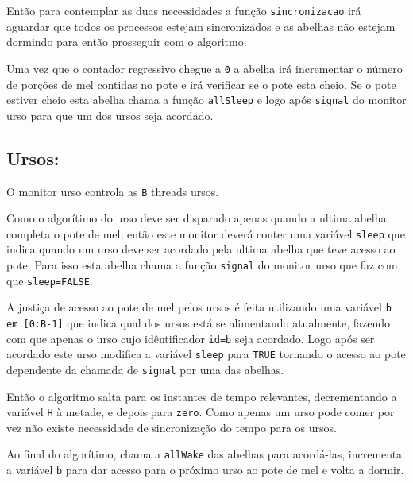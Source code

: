 \documentclass[12pt,a4paper]{article}
\begin{document}
Então para contemplar as duas necessidades a função \verb+sincronizacao+ irá aguardar que todos os processos estejam sincronizados e as abelhas não estejam dormindo para então prosseguir com o algoritmo.

Uma vez que o contador regressivo chegue a \verb+0+ a abelha irá incrementar o número de porções de mel contidas no pote e irá verificar se o pote esta cheio. Se o pote estiver cheio esta abelha chama a função \verb+allSleep+ e logo após \verb+signal+ do monitor urso para que um dos ursos seja acordado.

\subsection{Ursos:}

O monitor urso controla as \verb+B+ threads ursos.

Como o algorítimo do urso deve ser disparado apenas quando a ultima abelha completa o pote de mel, então este monitor deverá conter uma variável \verb+sleep+ que indica quando um urso deve ser acordado pela ultima abelha que teve acesso ao pote. Para isso esta abelha chama a função \verb+signal+ do monitor urso que faz com que \verb+sleep=FALSE+.

A justiça de acesso ao pote de mel pelos ursos é feita utilizando uma variável \verb+b em [0:B-1]+  que indica qual dos ursos está se alimentando atualmente, fazendo com que apenas o urso cujo idêntificador \verb+id=b+ seja acordado. Logo após ser acordado este urso modifica a variável \verb+sleep+ para \verb+TRUE+ tornando o acesso ao pote dependente da chamada de \verb+signal+ por uma das abelhas.

Então o algoritmo salta para os instantes de tempo relevantes, decrementando a variável \verb+H+ à metade, e depois para \verb+zero+. Como apenas um urso pode comer por vez não existe necessidade de sincronização do tempo para os ursos.

Ao final do algorítimo, chama a \verb+allWake+ das abelhas para acordá-las, incrementa a variável \verb+b+ para dar acesso para o próximo urso ao pote de mel e volta a dormir.
\end{document}

